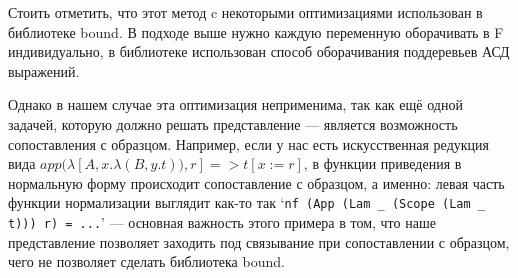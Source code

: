 \hfill

Стоить отметить, что этот метод c некоторыми оптимизациями использован в библиотеке bound\cite{bound}. В подходе выше нужно каждую переменную оборачивать в F индивидуально, в библиотеке использован способ оборачивания поддеревьев АСД выражений.

Однако в нашем случае эта оптимизация неприменима, так как ещё одной задачей, которую должно решать представление --- является возможность сопоставления с образцом. Например, если у нас есть искусственная редукция вида $app(\lambda[A, x.\lambda(B, y.t)), r] => t[x:=r]$, в функции приведения в нормальную форму происходит сопоставление с образцом, а именно: левая часть функции нормализации выглядит как-то так `\lstinline{nf (App (Lam _ (Scope (Lam _ t))) r) = ...}' --- основная важность этого примера в том, что наше представление позволяет заходить под связывание при сопоставлении с образцом, чего не позволяет сделать библиотека bound.
